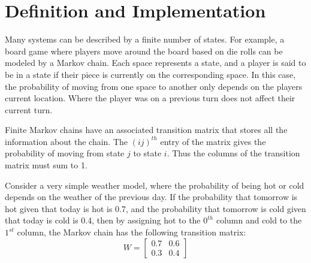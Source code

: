 \label{lab:Markov}


\section*{Definition and Implementation} %

Many systems can be described by a finite number of states.
For example, a board game where players move around the board based on die rolls can be modeled by a Markov chain.
Each space represents a state, and a player is said to be in a state if their piece is currently on the corresponding space.
In this case, the probability of moving from one space to another only depends on the players current location.
Where the player was on a previous turn does not affect their current turn.

Finite Markov chains have an associated transition matrix that stores all the information about the chain.
The $(ij)^{th}$ entry of the matrix gives the probability of moving from state $j$ to state $i$.
Thus the columns of the transition matrix must sum to 1. %

Consider a very simple weather model, where the probability of being hot or cold depends on the weather of the previous day.
If the probability that tomorrow is hot given that today is hot is 0.7, and the probability that tomorrow is cold given that today is cold is 0.4, then by assigning hot to the $0^{th}$ column and cold to the $1^{st}$ column, the Markov chain has the following transition matrix:
\[W = \left[\begin{array}{cc}
0.7 & 0.6 \\
0.3 & 0.4 \end{array} \right]\] 


